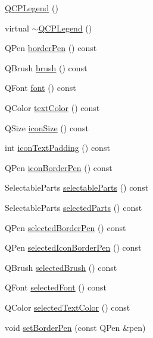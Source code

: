\begin{DoxyCompactItemize}
\item 
\hyperlink{class_q_c_p_legend_a0001a456989bd07ea378883651fabd72}{Q\+C\+P\+Legend} ()
\item 
virtual \hyperlink{class_q_c_p_legend_a52b305572e20f4e7cb37e945e2b9bec0}{$\sim$\+Q\+C\+P\+Legend} ()
\item 
Q\+Pen \hyperlink{class_q_c_p_legend_a8ffd92df86ddf43696d95f04a20e3226}{border\+Pen} () const 
\item 
Q\+Brush \hyperlink{class_q_c_p_legend_a7e5d2766e7d724f399022be8a4e8a2cb}{brush} () const 
\item 
Q\+Font \hyperlink{class_q_c_p_legend_a5cf8b840bc02f7bf4edb8dde400d0f41}{font} () const 
\item 
Q\+Color \hyperlink{class_q_c_p_legend_ad60a058af7491f6b140c104c6a0f9458}{text\+Color} () const 
\item 
Q\+Size \hyperlink{class_q_c_p_legend_a27dfb770b14adc0e8811bef8129780a5}{icon\+Size} () const 
\item 
int \hyperlink{class_q_c_p_legend_a9d6d07042a284c4ba5f9e3cb5c9281ef}{icon\+Text\+Padding} () const 
\item 
Q\+Pen \hyperlink{class_q_c_p_legend_a2c4719d79630b0d0c75ef2333c59a912}{icon\+Border\+Pen} () const 
\item 
Selectable\+Parts \hyperlink{class_q_c_p_legend_aa90c7fdbad7a0e93527bafb1f1f49a43}{selectable\+Parts} () const 
\item 
Selectable\+Parts \hyperlink{class_q_c_p_legend_abbbf1b2d6a149013527ed87b0780894a}{selected\+Parts} () const 
\item 
Q\+Pen \hyperlink{class_q_c_p_legend_a63156bc4ce64431bada7415cfa2b4dd1}{selected\+Border\+Pen} () const 
\item 
Q\+Pen \hyperlink{class_q_c_p_legend_a165630cad7e41f89b54f65cdef3310e8}{selected\+Icon\+Border\+Pen} () const 
\item 
Q\+Brush \hyperlink{class_q_c_p_legend_a600dde0d207ddc6f5a603767360cceac}{selected\+Brush} () const 
\item 
Q\+Font \hyperlink{class_q_c_p_legend_a4c1b08fc0afacb4ffd54f6a49737fa77}{selected\+Font} () const 
\item 
Q\+Color \hyperlink{class_q_c_p_legend_a08005f3c17728c2c4e23b8ffc0842ffb}{selected\+Text\+Color} () const 
\item 
void \hyperlink{class_q_c_p_legend_a866a9e3f5267de7430a6c7f26a61db9f}{set\+Border\+Pen} (const Q\+Pen \&pen)
\item 

\end{DoxyCompactItemize}
